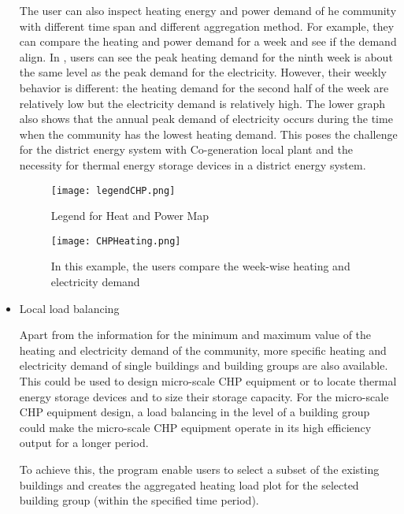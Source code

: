 \begin{itemize}
  The user can also inspect heating energy and power demand of he
  community with different time span and different aggregation
  method. For example, they can compare the heating and power demand
  for a week and see if the demand align. In ,
  users can see the peak heating demand for the ninth week is about
  the same level as the peak demand for the electricity. However,
  their weekly behavior is different: the heating demand for the
  second half of the week are relatively low but the electricity
  demand is relatively high. The lower graph also shows that the
  annual peak demand of electricity occurs during the time when the
  community has the lowest heating demand. This poses the challenge
  for the district energy system with Co-generation local plant and
  the necessity for thermal energy storage devices in a district
  energy system.

  \begin{figure}[h!]
    \centering
    \texttt{[image: legendCHP.png]}
    \caption[Legend for Heat and Power Map]{Legend for Heat and Power
      Map}
    \label{fig:legendCHP}
  \end{figure}

  \begin{figure}[h!]
    \centering
    \texttt{[image: CHPHeating.png]}
    \caption[Interface for CHP Sizing]{In this example, the users
      compare the week-wise heating and electricity demand}
    \label{fig:CHPHeating}
  \end{figure}

\item Local load balancing

  Apart from the information for the minimum and maximum value of the
  heating and electricity demand of the community, more specific
  heating and electricity demand of single buildings and building
  groups are also available. This could be used to design micro-scale
  CHP equipment or to locate thermal energy storage devices and to
  size their storage capacity.  For the micro-scale CHP equipment
  design, a load balancing in the level of a building group could make
  the micro-scale CHP equipment operate in its high efficiency output
  for a longer period.
  
  To achieve this, the program enable users to select a subset of the
  existing buildings and creates the aggregated heating load plot for
  the selected building group (within the specified time period). 


\end{itemize}
